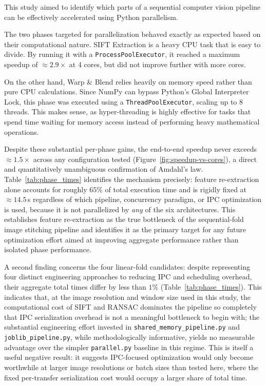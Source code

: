 \documentclass[10pt,twocolumn,letterpaper]{article}
\begin{document}
This study aimed to identify which parts of a sequential computer vision pipeline can be effectively accelerated using Python parallelism. 

The two phases targeted for parallelization behaved exactly as expected based on their computational nature. 
SIFT Extraction is a heavy CPU task that is easy to divide.
 By running it with a \texttt{ProcessPoolExecutor}, it reached a maximum speedup of $\approx 2.9\times$ at 4 cores, but did not improve further with more cores. 

On the other hand, Warp \& Blend relies heavily on memory speed rather than pure CPU calculations. 
Since NumPy can bypass Python's Global Interpreter Lock, this phase was executed using a \texttt{ThreadPoolExecutor}, scaling up to 8 threads. 
This makes sense, as hyper-threading is highly effective for tasks that spend time waiting for memory access instead of performing heavy mathematical operations.

Despite these substantial per-phase gains, the end-to-end speedup never exceeds
$\approx 1.5\times$ across any configuration tested (Figure~\ref{fig:speedup-vs-cores}), a
direct and quantitatively unambiguous confirmation of Amdahl's law. Table~\ref{tab:phase_times}
identifies the mechanism precisely: feature re-extraction alone accounts for roughly $65\%$ of
total execution time and is rigidly fixed at $\approx 14.5$\,s regardless of which pipeline,
concurrency paradigm, or IPC optimization is used, because it is not parallelized by \emph{any}
of the six architectures. This establishes feature re-extraction as the true bottleneck
of the sequential-fold image stitching pipeline and identifies it as the primary target for
any future optimization effort aimed at improving aggregate performance rather than isolated
phase performance.

A second finding concerns the four linear-fold candidates: despite representing
four distinct engineering approaches to reducing IPC and scheduling overhead, 
their aggregate total times differ by less than $1\%$ (Table~\ref{tab:phase_times}).
This indicates that, at the image resolution and window size used in this study, the
computational cost of SIFT and RANSAC dominates the pipeline so completely that IPC
serialization overhead is not a meaningful bottleneck to begin with; the substantial engineering
effort invested in \texttt{shared\_memory\_pipeline.py} and \texttt{joblib\_pipeline.py}, while
methodologically informative, yields no measurable advantage over the simpler
\texttt{parallel.py} baseline in this regime. This is itself a useful negative result: it
suggests IPC-focused optimization would only become worthwhile at larger image resolutions or
batch sizes than tested here, where the fixed per-transfer serialization cost would occupy a
larger share of total time.
\end{document}
